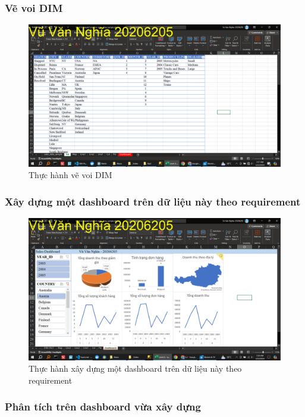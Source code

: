 \documentclass{article}
\begin{document}
\subsubsection{Vẽ voi DIM}

\begin{figure}[H]
\centering
\includegraphics[scale = 0.15]{Bai2/ThucHanh/voi.png}
\caption{Thực hành vẽ voi DIM}
\end{figure}

\subsubsection{Xây dựng một dashboard trên dữ liệu này theo requirement}

\begin{figure}[H]
\centering
\includegraphics[scale = 0.15]{Bai2/ThucHanh/dashboard.png}
\caption{Thực hành xây dựng một dashboard trên dữ liệu này theo requirement}
\end{figure}

\subsubsection{Phân tích trên dashboard vừa xây dựng}
\end{document}
